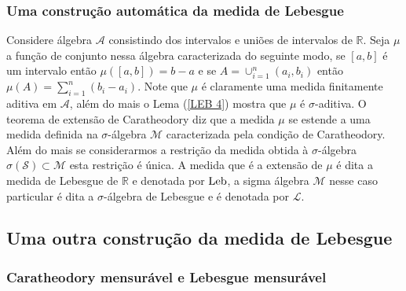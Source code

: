 \subsubsection{Uma construç\~ao autom\'atica da medida de Lebesgue}


Considere álgebra $\mathcal{A}$ consistindo dos 
intervalos e uniões de intervalos de   $\mathbb{R}.$ 
Seja  $\mu$ a  função de conjunto  nessa álgebra 
caracterizada do seguinte modo, se $[a,b]$ é um 
intervalo  então $\mu([a,b])=b-a$ 
e se $A=\cup_{i=1}^n(a_i,b_i)$ então 
$\mu(A)=\sum_{i=1}^n(b_i-a_i).$  
Note que $\mu$ é claramente uma medida 
finitamente aditiva em $\mathcal{A}$, 
além do mais o Lema (\ref{LEB 4}) mostra 
que $\mu$ é $\sigma$-aditiva. 
O teorema de extensão de Caratheodory diz que a 
medida $\mu$ se estende a uma medida definida na 
$\sigma$-álgebra  $\mathcal{M}$  
caracterizada pela condição de Caratheodory. 
Além do mais se considerarmos a restrição 
da medida obtida  à $\sigma$-álgebra
$\sigma(\mathcal{S})\subset \mathcal{M}$ 
esta restrição é única. A medida que é a 
extensão de $\mu$ é dita a medida de Lebesgue 
de $\mathbb{R}$ e denotada por $\textnormal{Leb}$, 
a sigma álgebra $\mathcal{M}$ nesse caso particular
é dita a $\sigma$-álgebra de Lebesgue e é denotada por $\mathcal{L}$.






































\subsection*{Uma outra construç\~ao da medida de Lebesgue}













\subsubsection{Caratheodory mensur\'avel e Lebesgue mensur\'avel}





